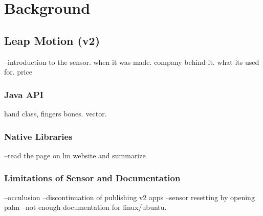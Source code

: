 
\chapter{Background}

\label{Chapter1} 

\section{Leap Motion (v2)}
--introduction to the sensor. when it was made. company behind it. what its used for. price



\subsection{Java API}
hand class, fingers bones. vector. 



\subsection{Native Libraries}
--read the page on lm website and summarize




\subsection{Limitations of Sensor and Documentation}
--occulusion
--discontinuation of publishing v2 apps
--sensor resetting by opening palm
--not enough documentation for linux/ubuntu. 




